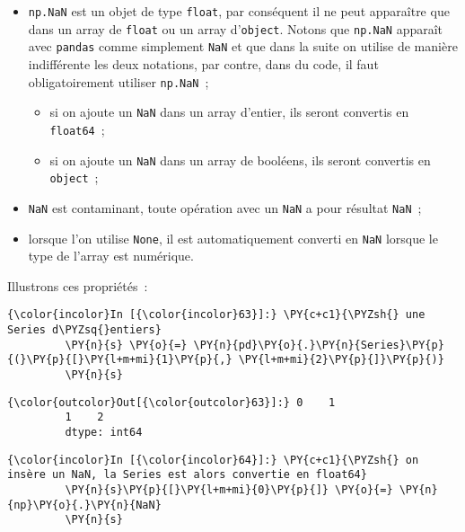 \begin{itemize}
\tightlist
\item
  \texttt{np.NaN} est un objet de type \texttt{float}, par conséquent il
  ne peut apparaître que dans un array de \texttt{float} ou un array
  d'\texttt{object}. Notons que \texttt{np.NaN} apparaît avec
  \texttt{pandas} comme simplement \texttt{NaN} et que dans la suite on
  utilise de manière indifférente les deux notations, par contre, dans
  du code, il faut obligatoirement utiliser \texttt{np.NaN}~;

  \begin{itemize}
  \tightlist
  \item
    si on ajoute un \texttt{NaN} dans un array d'entier, ils seront
    convertis en \texttt{float64}~;
  \item
    si on ajoute un \texttt{NaN} dans un array de booléens, ils seront
    convertis en \texttt{object}~;
  \end{itemize}
\item
  \texttt{NaN} est contaminant, toute opération avec un \texttt{NaN} a
  pour résultat \texttt{NaN}~;
\item
  lorsque l'on utilise \texttt{None}, il est automatiquement converti en
  \texttt{NaN} lorsque le type de l'array est numérique.
\end{itemize}

Illustrons ces propriétés~:

    \begin{Verbatim}[commandchars=\\\{\},frame=single,framerule=0.3mm,rulecolor=\color{cellframecolor}]
{\color{incolor}In [{\color{incolor}63}]:} \PY{c+c1}{\PYZsh{} une Series d\PYZsq{}entiers}
         \PY{n}{s} \PY{o}{=} \PY{n}{pd}\PY{o}{.}\PY{n}{Series}\PY{p}{(}\PY{p}{[}\PY{l+m+mi}{1}\PY{p}{,} \PY{l+m+mi}{2}\PY{p}{]}\PY{p}{)}
         \PY{n}{s}
\end{Verbatim}


\begin{Verbatim}[commandchars=\\\{\},frame=single,framerule=0.3mm,rulecolor=\color{cellframecolor}]
{\color{outcolor}Out[{\color{outcolor}63}]:} 0    1
         1    2
         dtype: int64
\end{Verbatim}
            
    \begin{Verbatim}[commandchars=\\\{\},frame=single,framerule=0.3mm,rulecolor=\color{cellframecolor}]
{\color{incolor}In [{\color{incolor}64}]:} \PY{c+c1}{\PYZsh{} on insère un NaN, la Series est alors convertie en float64}
         \PY{n}{s}\PY{p}{[}\PY{l+m+mi}{0}\PY{p}{]} \PY{o}{=} \PY{n}{np}\PY{o}{.}\PY{n}{NaN}
         \PY{n}{s}
\end{Verbatim}


